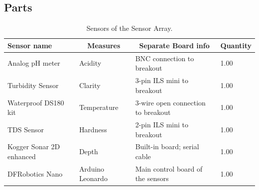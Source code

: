 \documentclass[
  english,
  man,floatsintext]{apa6}
\begin{document}
\newpage

\hypertarget{parts}{%
\subsection{Parts}\label{parts}}

\begin{table}[H]

\begin{center}
\begin{threeparttable}

\caption{\label{tab:table1}Sensors of the Sensor Array.}

\begin{tabular}{llll}
\toprule
Sensor name & \multicolumn{1}{c}{Measures} & \multicolumn{1}{c}{Separate Board info} & \multicolumn{1}{c}{Quantity}\\
\midrule
Analog pH meter & Acidity & BNC connection to breakout & 1.00\\
Turbidity Sensor & Clarity & 3-pin ILS mini to breakout & 1.00\\
Waterproof DS180 kit & Temperature & 3-wire open connection to breakout & 1.00\\
TDS Sensor & Hardness & 2-pin ILS mini to breakout & 1.00\\
Kogger Sonar 2D enhanced & Depth & Built-in board; serial cable & 1.00\\
DFRobotics Nano & Arduino Leonardo & Main control board of the sensors & 1.00\\
\bottomrule
\end{tabular}

\end{threeparttable}
\end{center}

\end{table}
\end{document}
